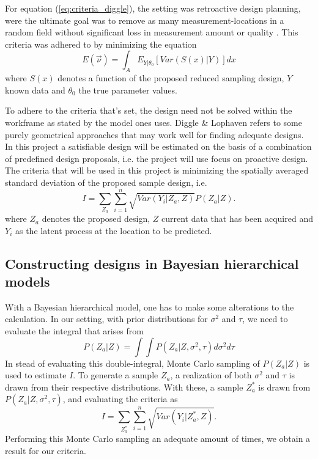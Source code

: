 For equation (\ref{eq:criteria_diggle}), the setting was retroactive design planning, were the ultimate goal was to remove as many measurement-locations in a random field without significant loss in measurement amount or quality \cite{DiggleEtAl}. This criteria was adhered to by minimizing the equation 
\begin{equation} \label{eq:criteria_diggle}
E(\vec{\nu}) = \int_A E_{Y|\theta_0} [Var(S(x)|Y)]dx
\end{equation}
where $S(x)$ denotes a function of the proposed reduced sampling design, $Y$ known data and $\theta_0$ the true parameter values.

To adhere to the criteria that's set, the design need not be solved within the workframe as stated by the model ones uses. Diggle \& Lophaven \cite{DiggleEtAl} refers to some purely geometrical approaches that may work well for finding adequate designs. In this project a satisfiable design will be estimated on the basis of a combination of predefined design proposals, i.e. the project will use focus on proactive design. The criteria that will be used in this project is minimizing the spatially averaged standard deviation of the proposed sample design, i.e. 
\begin{equation} \label{eq:criteria}
I = \sum_{Z_a} \sum_{i=1}^n \sqrt{ Var (Y_i | Z_a, Z) } P(Z_a | Z) .
\end{equation}
where $Z_a$ denotes the proposed design, $Z$ current data that has been acquired and $Y_i$ as the latent process at the location to be predicted. 

\subsection{Constructing designs in Bayesian hierarchical models}

With a Bayesian hierarchical model, one has to make some alterations to the calculation. In our setting, with prior distributions for $\sigma^2$ and $\tau$, we need to evaluate the integral that arises from 
\begin{equation*}
P(Z_a | Z) = \int \int P(Z_a | Z, \sigma^2, \tau) d\sigma^2 d\tau
\end{equation*}
In stead of evaluating this double-integral, Monte Carlo sampling of $P(Z_a | Z)$ is used to estimate $I$. To generate a sample $Z_a$, a realization of both $\sigma^2$ and $\tau$ is drawn from their respective distributions.
With these, a sample $Z_a^*$ is drawn from $P(Z_a | Z, \sigma^2, \tau)$, and evaluating the criteria as 
\begin{equation*}
I = \sum_{Z_a^*} \sum_{i=1}^n \sqrt{ Var (Y_i | Z_a^*, Z) }.
\end{equation*}
Performing this Monte Carlo sampling an adequate amount of times, we obtain a result for our criteria. 